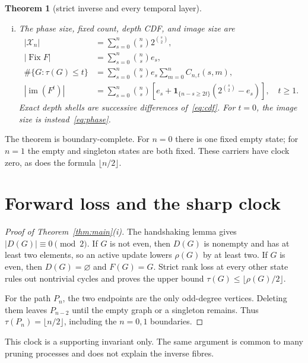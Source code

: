 \documentclass[a4paper,10pt]{amsart}
\newtheorem{theorem}{Theorem}
\theoremstyle{remark}
\newcommand{\X}{\mathcal X}
\newcommand{\rank}{\rho}
\begin{document}
\begin{theorem}[strict inverse and every temporal layer]
\begin{enumerate}[(i)]
\item The phase size, fixed count, depth CDF, and image size are
\begin{align}
 |\X_n|&=\sum_{s=0}^n\binom ns2^{\binom s2},
                                                        \label{eq:phase}\\
 |\operatorname{Fix}F|&=\sum_{s=0}^n\binom ns e_s,
                                                        \label{eq:fixed}\\
 \#\{G:\tau(G)\leq t\}
 &=\sum_{s=0}^n\binom ns e_s\sum_{m=0}^n C_{n,t}(s,m),
                                                        \label{eq:cdf}\\
 |\operatorname{im}(F^t)|
 &=\sum_{s=0}^n\binom ns
 \left[e_s+\mathbf1_{\{n-s\geq2t\}}
 \left(2^{\binom s2}-e_s\right)\right],\quad t\geq1.
                                                        \label{eq:image-count}
\end{align}
Exact depth shells are successive differences of~\eqref{eq:cdf}.
For $t=0$, the image size is instead~\eqref{eq:phase}.
\end{enumerate}
\end{theorem}

The theorem is boundary-complete.  For $n=0$ there is one fixed empty state;
for $n=1$ the empty and singleton states are both fixed.  These carriers have
clock zero, as does the formula $\lfloor n/2\rfloor$.

\section{Forward loss and the sharp clock}\label{sec:forward}

\begin{proof}[Proof of Theorem~\ref{thm:main}(i)]
The handshaking lemma gives $|D(G)|\equiv0\pmod2$.  If $G$ is not even, then
$D(G)$ is nonempty and has at least two elements, so an active update lowers
$\rank(G)$ by at least two.  If $G$ is even, then $D(G)=\varnothing$ and
$F(G)=G$.  Strict rank loss at every other state rules out nontrivial cycles
and proves the upper bound $\tau(G)\leq\lfloor\rank(G)/2\rfloor$.

For the path $P_n$, the two endpoints are the only odd-degree vertices.
Deleting them leaves $P_{n-2}$ until the empty graph or a singleton remains.
Thus $\tau(P_n)=\lfloor n/2\rfloor$, including the $n=0,1$ boundaries.
\end{proof}

This clock is a supporting invariant only.  The same argument is common to
many pruning processes and does not explain the inverse fibres.
\end{document}
